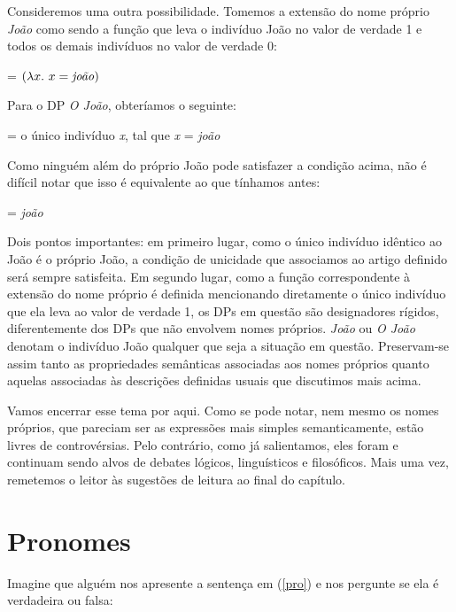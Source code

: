 Consideremos uma outra possibilidade. Tomemos a extensão
do nome próprio \textit{João} como sendo a função que leva o indivíduo
João no valor de verdade 1 e todos os demais
indivíduos no valor de verdade 0:

\begin{exe}
	\ex {} = $(\lambda x.\ x=\text{\textit{joão}})$
\end{exe}

\n Para o DP \textit{O João}, obteríamos o seguinte:

\begin{exe}
	\ex {} = o único indivíduo \textit{x}, tal que \textit{x} = \textit{joão}
\end{exe}

\n Como ninguém além do próprio João pode satisfazer a condição acima, não é difícil notar que isso é equivalente ao que tínhamos
antes:

\begin{exe}
	\ex {} = \textit{joão}
\end{exe}

\n Dois pontos importantes: em primeiro lugar, como o único indivíduo
idêntico ao João é o próprio João, a condição de unicidade que
associamos ao artigo definido será sempre satisfeita. Em segundo
lugar, como a função correspondente à extensão do nome próprio é
definida mencionando diretamente o único indivíduo que ela leva ao
valor de verdade 1, os DPs em questão são designadores rígidos,
diferentemente dos DPs que não envolvem nomes próprios. \textit{João} ou
\textit{O João} denotam o indivíduo João qualquer que seja a situação em
questão. Preservam-se assim tanto as propriedades semânticas
associadas aos nomes próprios quanto aquelas associadas às
descrições definidas usuais que discutimos mais acima.

Vamos encerrar esse tema por aqui. Como se pode notar, nem mesmo os nomes próprios, que pareciam ser as expressões mais simples semanticamente, estão livres de controvérsias. Pelo contrário, como já salientamos, eles foram e continuam sendo alvos de debates lógicos, linguísticos e filosóficos. Mais uma vez, remetemos o leitor às sugestões de leitura ao final do capítulo.



\section{Pronomes}

Imagine que alguém nos apresente a sentença em (\ref{pro}) e nos
pergunte se ela é verdadeira ou falsa:

